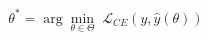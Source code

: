 \documentclass[preview]{standalone}
\begin{document}
\begin{align*}
\theta^* = \arg\min_{\theta\in\Theta}\;\mathcal{L}_{CE}(y,\hat y(\theta))
\end{align*}
\end{document}
